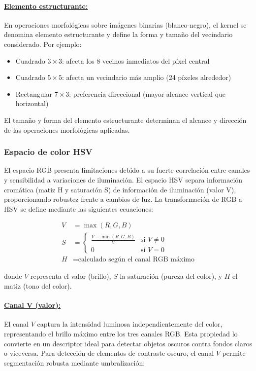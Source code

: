 \paragraph{\underline{Elemento estructurante:}}En operaciones morfológicas sobre imágenes binarias (blanco-negro), el kernel se denomina elemento estructurante y define la forma y tamaño del vecindario considerado. Por ejemplo:
\begin{itemize}[label=$\bullet$]
\item Cuadrado $3 \times 3$: afecta los 8 vecinos inmediatos del píxel central
\item Cuadrado $5 \times 5$: afecta un vecindario más amplio (24 píxeles alrededor)
\item Rectangular $7 \times 3$: preferencia direccional (mayor alcance vertical que horizontal)
\end{itemize}

El tamaño y forma del elemento estructurante determinan el alcance y dirección de las operaciones morfológicas aplicadas.

\subsubsection{Espacio de color HSV}

El espacio RGB presenta limitaciones debido a su fuerte correlación entre canales y sensibilidad a variaciones de iluminación. El espacio HSV separa información cromática (matiz H y saturación S) de información de iluminación (valor V), proporcionando robustez frente a cambios de luz. La transformación de RGB a HSV se define mediante las siguientes ecuaciones:

\begin{align}
V &= \max(R, G, B) \\
S &= \begin{cases}
\frac{V - \min(R,G,B)}{V} & \text{si } V \neq 0 \\
0 & \text{si } V = 0
\end{cases} \\
H &= \text{calculado según el canal RGB máximo}
\end{align}

donde $V$ representa el valor (brillo), $S$ la saturación (pureza del color), y $H$ el matiz (tono del color).

\paragraph{\underline{Canal V (valor):}}El canal $V$ captura la intensidad luminosa independientemente del color, representando el brillo máximo entre los tres canales RGB. Esta propiedad lo convierte en un descriptor ideal para detectar objetos oscuros contra fondos claros o viceversa. Para detección de elementos de contraste oscuro, el canal $V$ permite segmentación robusta mediante umbralización:

